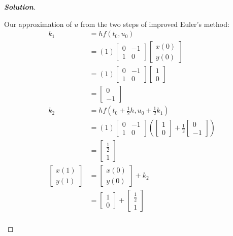 \documentclass[11pt]{article}
\newenvironment{solution}{%
  \begin{proof}[\textbf{Solution}]$ $\par\nobreak\ignorespaces
}{%
  \end{proof}
}
\theoremstyle{definition}
\begin{document}
\begin{solution}
\begin{enumerate}[(a)]
Our approximation of $u$ from the two steps of improved Euler's method:
\begin{align*}
    k_1 &= hf(t_0, u_0) \\
    &= (1)\begin{bmatrix*}0 & -1 \\ 1 & 0\end{bmatrix*}\begin{bmatrix*}x(0) \\ y(0)\end{bmatrix*} \\
    &= (1)\begin{bmatrix*}0 & -1 \\ 1 & 0\end{bmatrix*}\begin{bmatrix*}1 \\ 0\end{bmatrix*} \\
    &= \begin{bmatrix*}0 \\ -1\end{bmatrix*} \\
    k_2 &= hf\left(t_0 + \frac{1}{2}h, u_0 + \frac{1}{2}k_1\right) \\
    &= (1)\begin{bmatrix*}0 & -1 \\ 1 & 0\end{bmatrix*}\left(\begin{bmatrix*}1 \\ 0\end{bmatrix*} + \frac{1}{2}\begin{bmatrix*}0 \\ -1\end{bmatrix*}\right) \\
    &= \begin{bmatrix*}\frac{1}{2} \\ 1\end{bmatrix*} \\
    \begin{bmatrix*}x(1) \\ y(1)\end{bmatrix*} &= \begin{bmatrix*}x(0) \\ y(0)\end{bmatrix*} + k_2 \\
    &= \begin{bmatrix*}1 \\ 0\end{bmatrix*}+ \begin{bmatrix*}\frac{1}{2} \\ 1 \end{bmatrix*}\\

\end{align*}
\end{enumerate}
\end{solution}
\end{document}
